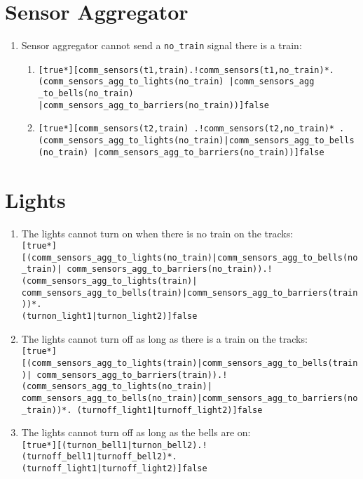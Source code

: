 \documentclass[final]{report}
\begin{document}
\section{Sensor Aggregator}
\label{sec:translated-requirements-sensor-aggregator}

\begin{enumerate}
\item Sensor aggregator cannot send a \texttt{no\_train} signal there is a train:
\begin{enumerate}[label=\roman*]
\item \texttt{[true*][comm\_sensors(t1,train).!comm\_sensors(t1,no\_train)*.\\(comm\_sensors\_agg\_to\_lights(no\_train) |comm\_sensors\_agg \_to\_bells(no\_train) |comm\_sensors\_agg\_to\_barriers(no\_train))]false} 

\item \texttt{[true*][comm\_sensors(t2,train) .!comm\_sensors(t2,no\_train)* .\\(comm\_sensors\_agg\_to\_lights(no\_train)|comm\_sensors\_agg\_to\_bells(no\_train) |comm\_sensors\_agg\_to\_barriers(no\_train))]false}

\end{enumerate}

\end{enumerate}

\section{Lights}
\label{sec:translated-requirements-lights}

\begin{enumerate}
    \item The lights cannot turn on when there is no train on the tracks:\\
        \texttt{[true*][(comm\_sensors\_agg\_to\_lights(no\_train)|comm\_sensors\_agg\_to\_bells(no\_train)| comm\_sensors\_agg\_to\_barriers(no\_train)).!(comm\_sensors\_agg\_to\_lights(train)| comm\_sensors\_agg\_to\_bells(train)|comm\_sensors\_agg\_to\_barriers(train))*.\\(turnon\_light1|turnon\_light2)]false}

    \item The lights cannot turn off as long as there is a train on the tracks:\\
        \texttt{[true*][(comm\_sensors\_agg\_to\_lights(train)|comm\_sensors\_agg\_to\_bells(train)| comm\_sensors\_agg\_to\_barriers(train)).!(comm\_sensors\_agg\_to\_lights(no\_train)| comm\_sensors\_agg\_to\_bells(no\_train)|comm\_sensors\_agg\_to\_barriers(no\_train))*. (turnoff\_light1|turnoff\_light2)]false}

    \item The lights cannot turn off as long as the bells are on:\\
        \texttt{[true*][(turnon\_bell1|turnon\_bell2).!(turnoff\_bell1|turnoff\_bell2)*.\\(turnoff\_light1|turnoff\_light2)]false}
\end{enumerate}
\end{document}
